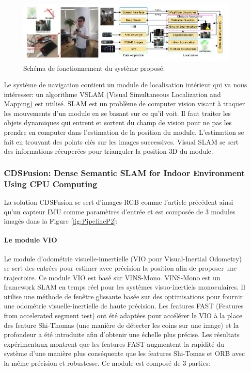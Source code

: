 \documentclass[11pt]{article}
\begin{document}
  \begin{figure}[hbt]  
    \includegraphics[width=\textwidth]{PipelineP1.png}    
    \caption{Schéma de fonctionnement du système proposé.}
    \label{fig:PipelineP1}
  \end{figure} 

  Le système de navigation contient un module de localisation intérieur qui va nous intéresser: un algorithme VSLAM (Visual Simultaneous 
  Localization and Mapping) est utilisé. SLAM est un problème de computer vision visant à traquer les mouvements d'un module en se basant
  sur ce qu'il voit. Il faut traiter les objets dynamiques qui entrent et sortent du champ de vision pour ne pas les prendre en computer
  dans l'estimation de la position du module. L'estimation se fait en trouvant des points clés sur les images successives.  Visual SLAM
  se sert des informations récuperées pour trianguler la position 3D du module. 
  
  \pagebreak

  \subsubsection{CDSFusion: Dense Semantic SLAM for Indoor Environment Using CPU
  Computing}  

  La solution CDSFusion se sert d'images RGB comme l'article précédent ainsi qu'un capteur IMU comme paramètres d'entrée et est composée de 
  3 modules imagés dans la Figure \ref{fig:PipelineP2}:

  \paragraph{Le module VIO}
  Le module d'odométrie visuelle-innertielle (VIO pour Visual-Inertial Odometry) se sert des entrées pour estimer avec précision la position 
  afin de proposer une trajectoire. Ce module VIO est basé sur VINS-Mono. VINS-Mono est un framework SLAM en temps réel pour les 
  systèmes visuo-inertiels monoculaires. Il utilise une méthode de fenêtre glissante basée sur des optimisations pour fournir une odométrie 
  visuelle-inertielle de haute précision.
  Les features FAST (Features from accelerated segment test) ont été adaptées pour accélérer le VIO à 
  la place des feature Shi-Thomas (une manière de détecter les coins sur une image) et la profondeur a été introduite afin d'obtenir une échelle 
  plus précise. Les résultats expérimentaux montrent que les features FAST augmentent la rapidité du système d'une manière plus conséquente 
  que les features Shi-Tomas et ORB avec la même précision et robustesse. Ce module est composé de 3 parties:
\end{document}
